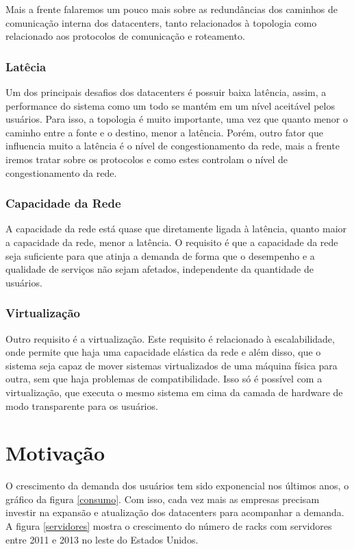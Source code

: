 \documentclass[12pt,a4paper]{report}
\begin{document}
Mais a frente falaremos um pouco mais sobre as redundâncias dos caminhos de comunicação interna dos datacenters, tanto relacionados à topologia como relacionado aos protocolos de comunicação e roteamento.\\

\subsection{Latêcia}
Um dos principais desafios dos datacenters é possuir baixa latência, assim, a performance do sistema como um todo se mantém em um nível aceitável pelos usuários. Para isso, a topologia é muito importante, uma vez que quanto menor o caminho entre a fonte e o destino, menor a latência. Porém, outro fator que influencia muito a latência é o nível de congestionamento da rede, mais a frente iremos tratar sobre os protocolos e como estes controlam o nível de congestionamento da rede.\\

\subsection{Capacidade da Rede}
A capacidade da rede está quase que diretamente ligada à latência, quanto maior a capacidade da rede, menor a latência. O requisito é que a capacidade da rede seja suficiente para que atinja a demanda de forma que o desempenho e a qualidade de serviços não sejam afetados, independente da quantidade de usuários.\\

\subsection{Virtualização}
Outro requisito é a virtualização. Este requisito é relacionado à escalabilidade, onde permite que haja uma capacidade elástica da rede e além disso, que o sistema seja capaz de mover sistemas virtualizados de uma máquina física para outra, sem que haja problemas de compatibilidade. Isso só é possível com a virtualização, que executa o mesmo sistema em cima da camada de hardware de modo transparente para os usuários.\\

\chapter{Motivação}

O crescimento da demanda dos usuários tem sido exponencial nos últimos anos, o gráfico da figura \ref{consumo}. Com isso, cada vez mais as empresas precisam investir na expansão e atualização dos datacenters para acompanhar a demanda. A figura \ref{servidores} mostra o crescimento do número de racks com servidores entre 2011 e 2013 no leste do Estados Unidos.\\
\end{document}
